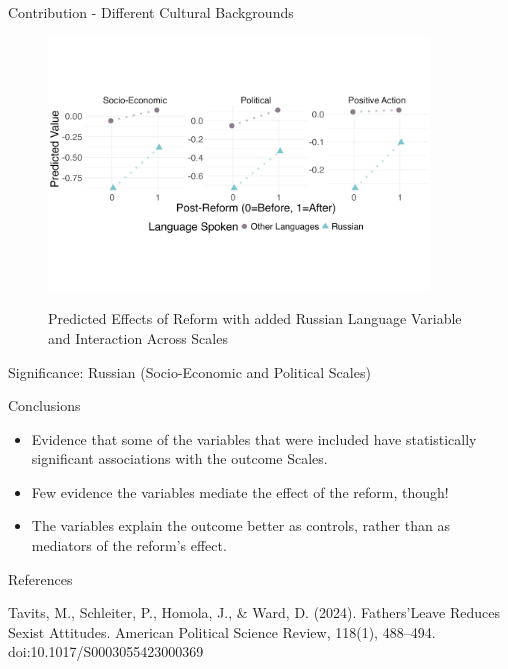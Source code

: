 \documentclass{beamer}
\begin{document}
	\begin{frame}{Contribution - Different Cultural Backgrounds}
		
		\begin{figure}
			\centering
			\captionsetup{justification=centering, labelsep=period} 
			\caption{Predicted Effects of Reform with added Russian Language Variable and Interaction Across Scales}
			\vspace*{-1cm}
			\includegraphics[width=0.9\textwidth]{russian_plot}
			\label{fig:russian_plot}
		\end{figure}
		\vspace{-1.5cm}	
		Significance: Russian (Socio-Economic and Political Scales)
	\end{frame}
	
	\begin{frame}{Conclusions}
		
		\begin{itemize}
			\item Evidence that some of the variables that were included have statistically significant associations with the outcome Scales.
			\item Few evidence the variables mediate the effect of the reform, though!
			\item The variables explain the outcome better as controls, rather than as mediators of the reform's effect. 
		\end{itemize}

	\end{frame}
	
		\begin{frame}{References}
		
	Tavits, M., Schleiter, P., Homola, J., \& Ward, D. (2024). Fathers’Leave Reduces Sexist Attitudes. American Political Science Review, 118(1), 488–494. doi:10.1017/S0003055423000369
	
	\end{frame}
	
	
\end{document}
